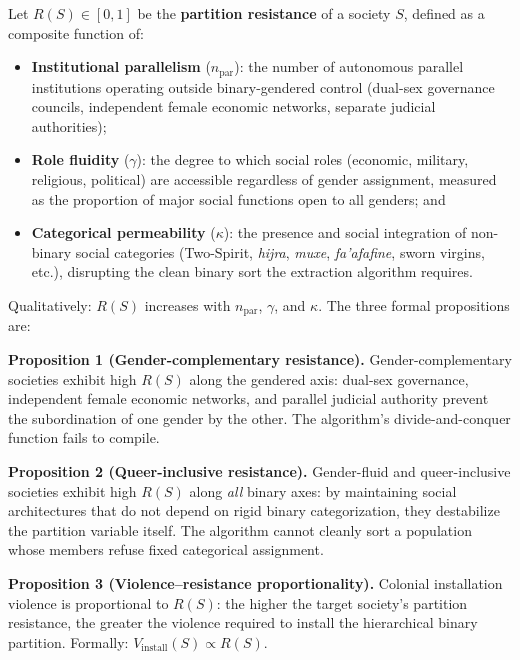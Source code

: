 \documentclass[12pt,openany]{book}
\begin{document}
\begin{definition}
\label{def:structural_immunity}
Let $R(S) \in [0,1]$ be the \textbf{partition resistance} of a society $S$, defined as a composite function of:
\begin{itemize}[leftmargin=*]
    \item \textbf{Institutional parallelism} ($n_{\text{par}}$): the number of autonomous parallel institutions operating outside binary-gendered control (dual-sex governance councils, independent female economic networks, separate judicial authorities);
    \item \textbf{Role fluidity} ($\gamma$): the degree to which social roles (economic, military, religious, political) are accessible regardless of gender assignment, measured as the proportion of major social functions open to all genders; and
    \item \textbf{Categorical permeability} ($\kappa$): the presence and social integration of non-binary social categories (Two-Spirit, \textit{hijra}, \textit{muxe}, \textit{fa'afafine}, sworn virgins, etc.), disrupting the clean binary sort the extraction algorithm requires.
\end{itemize}

\noindent Qualitatively: $R(S)$ increases with $n_{\text{par}}$, $\gamma$, and $\kappa$. The three formal propositions are:

\medskip
\textbf{Proposition 1 (Gender-complementary resistance).}
Gender-complementary societies exhibit high $R(S)$ along the gendered axis: dual-sex governance, independent female economic networks, and parallel judicial authority prevent the subordination of one gender by the other. The algorithm's divide-and-conquer function fails to compile.

\medskip
\textbf{Proposition 2 (Queer-inclusive resistance).}
Gender-fluid and queer-inclusive societies exhibit high $R(S)$ along \textit{all} binary axes: by maintaining social architectures that do not depend on rigid binary categorization, they destabilize the partition variable itself. The algorithm cannot cleanly sort a population whose members refuse fixed categorical assignment.

\medskip
\textbf{Proposition 3 (Violence--resistance proportionality).}
Colonial installation violence is proportional to $R(S)$: the higher the target society's partition resistance, the greater the violence required to install the hierarchical binary partition. Formally: $V_{\text{install}}(S) \propto R(S)$.


\end{definition}
\end{document}
